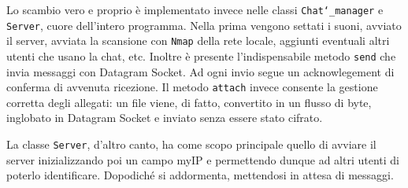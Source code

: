 Lo scambio vero e proprio è implementato invece nelle classi \texttt{Chat\char`_manager} e \texttt{Server},
cuore dell'intero programma. Nella prima vengono settati i suoni, avviato il server, avviata la scansione
con \texttt{Nmap} della rete locale, aggiunti eventuali altri utenti che usano la chat, etc. Inoltre
è presente l'indispensabile metodo \texttt{send} che invia messaggi con Datagram Socket. Ad ogni
invio segue un acknowlegement di conferma di avvenuta ricezione.
Il metodo \texttt{attach} invece consente la gestione corretta degli allegati: un file viene, di
fatto, convertito in un flusso di byte, inglobato in Datagram Socket e inviato senza essere stato cifrato.

La classe \texttt{Server}, d'altro canto, ha come scopo principale quello di avviare il server
inizializzando poi un campo myIP e permettendo dunque ad altri utenti di poterlo identificare.
Dopodiché si addormenta, mettendosi in attesa di messaggi.